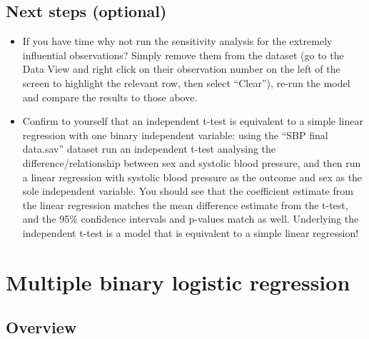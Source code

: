 \documentclass[
]{book}
\begin{document}
\hypertarget{next-steps-optional-1}{%
\section{Next steps (optional)}\label{next-steps-optional-1}}

\begin{itemize}
\item
  If you have time why not run the sensitivity analysis for the extremely influential observations? Simply remove them from the dataset (go to the Data View and right click on their observation number on the left of the screen to highlight the relevant row, then select ``Clear''), re-run the model and compare the results to those above.
\item
  Confirm to yourself that an independent t-test is equivalent to a simple linear regression with one binary independent variable: using the ``SBP final data.sav'' dataset run an independent t-test analysing the difference/relationship between sex and systolic blood pressure, and then run a linear regression with systolic blood pressure as the outcome and sex as the sole independent variable. You should see that the coefficient estimate from the linear regression matches the mean difference estimate from the t-test, and the 95\% confidence intervals and p-values match as well. Underlying the independent t-test is a model that is equivalent to a simple linear regression!
\end{itemize}

\hypertarget{multiple-binary-logistic-regression}{%
\chapter{Multiple binary logistic regression}\label{multiple-binary-logistic-regression}}

\hypertarget{overview-14}{%
\section{Overview}\label{overview-14}}
\end{document}
